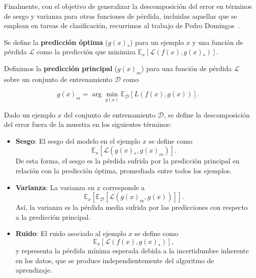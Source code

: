 Finalmente, con el objetivo de generalizar la descomposición del error en términos de sesgo y varianza para otras funciones de pérdida, incluidas aquellas que se emplean en tareas de clasificación, recurrimos al trabajo de Pedro Domingos~\cite{Domingos2000}.

\begin{definicion}
    Se define la \textbf{predicción óptima} ($g(x)_{*}$) para un ejemplo $x$ y una función de pérdida $\mathcal{L}$ como la predicción que minimiza $\mathbb{E}_{x}[\mathcal{L}(f(x), g(x)_{*})]$.
\end{definicion}

\begin{definicion}
    Definimos la \textbf{predicción principal} ($g(x)_{m}$) para una función de pérdida $\mathcal{L}$ sobre un conjunto de entrenamiento $\mathcal{D}$ como

    \[
        g(x)_{m} = \arg\min_{g(x)} \mathbb{E}_{\mathcal{D}}[L(f(x), g(x))].
    \]
\end{definicion}

\begin{definicion}
    Dado un ejemplo $x$ del conjunto de entrenamiento $\mathcal{D}$, se define la descomposición del error fuera de la muestra en los siguientes términos:
    
    \begin{itemize}
        \item \textbf{Sesgo}: El sesgo del modelo en el ejemplo $x$ se define como
        \[
            \mathbb{E}_{x}[\mathcal{L}(g(x)_{*}, g(x)_{m})].
        \]
        De esta forma, el sesgo es la pérdida sufrida por la predicción principal en relación con la predicción óptima, promediada entre todos los ejemplos.
    
        \item \textbf{Varianza}: La varianza en $x$ corresponde a
        \[
            \mathbb{E}_{x}[\mathbb{E}_{\mathcal{D}}[\mathcal{L}(g(x)_{m}, g(x))]].
        \]
        Así, la varianza es la pérdida media sufrida por las predicciones con respecto a la predicción principal.
    
        \item \textbf{Ruido}: El ruido asociado al ejemplo $x$ se define como
        \[
            \mathbb{E}_{x}[\mathcal{L}(f(x), g(x)_{*})],
        \]
        y representa la pérdida mínima esperada debida a la incertidumbre inherente en los datos, que se produce independientemente del algoritmo de aprendizaje.
    \end{itemize}
\end{definicion}

